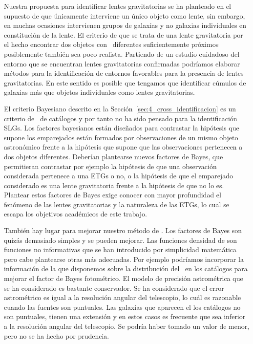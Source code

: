 Nuestra propuesta para identificar lentes gravitatorias se ha planteado en el supuesto de que únicamente interviene un único objeto como lente, sin embargo, en muchas ocasiones intervienen grupos de galaxias y no galaxias individuales en constitución de la lente. El criterio de que se trata de una lente gravitatoria por el hecho encontrar dos objetos con \rt\ diferentes suficientemente próximos posiblemente también sea poco realista. Partiendo de un estudio cuidadoso del entorno que se encuentran lentes gravitatorias confirmadas podríamos elaborar métodos para la identificación de entornos favorables para la presencia de lentes gravitatorias. En este sentido es posible que tengamos que identificar cúmulos de galaxias más que objetos individuales como lentes gravitatorias.

El criterio Bayesiano descrito en la Sección~\ref{sec:4_cross_identificacion} es un criterio de \cross\ de catálogos y por tanto no ha sido pensado para la identificación SLGs. Los factores bayesianos están diseñados para contrastar la hipótesis  que supone los emparejados están formados por observaciones de un mismo objeto astronómico frente a la hipótesis  que supone que las observaciones pertenecen a dos objetos diferentes. Deberían plantearse nuevos factores de Bayes, que permitieran contrastar por ejemplo la hipótesis de que una observación considerada pertenece a una ETGs o no, o la hipótesis de que el emparejado considerado es una lente gravitatoria frente a la hipótesis de que no lo es. Plantear estos factores de Bayes exige conocer con mayor profundidad el fenómeno de las lentes gravitatorias y la naturaleza de las ETGs, lo cual se escapa los objetivos académicos de este trabajo.

También hay lugar para mejorar nuestro método de \cross. Los factores de Bayes son quizás demasiado simples y se pueden mejorar. Las funciones densidad de  son funciones no informativas que se han introducido por simplicidad matemática pero cabe plantearse otras más adecuadas. Por ejemplo podríamos incorporar la información de la que disponemos sobre la distribución del \rt\ en los catálogos para mejorar el factor de Bayes fotométrico. El modelo de precisión astrométrica que se ha considerado es bastante conservador. Se ha considerado que el error astrométrico es igual a la resolución angular del telescopio, lo cuál es razonable cuando las fuentes son puntuales. Las galaxias que aparecen el los catálogos no son puntuales, tienen una extensión y en estos casos es frecuente que  sea inferior a la resolución angular del telescopio. Se podría haber tomado un valor de  menor, pero no se ha hecho por prudencia.

